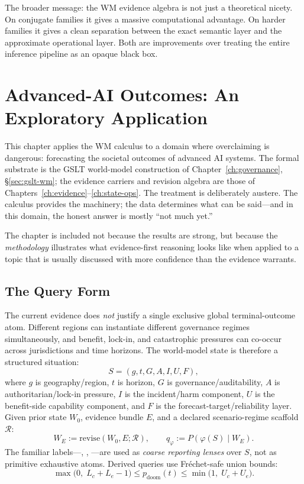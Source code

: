 \documentclass[11pt,openany]{report}
\begin{document}
\noindent
The broader message: the WM evidence algebra is not just a
theoretical nicety.  On conjugate families it gives a massive
computational advantage.  On harder families it gives a clean
separation between the exact semantic layer and the approximate
operational layer.  Both are improvements over treating the
entire inference pipeline as an opaque black box.


\chapter{Advanced-AI Outcomes: An Exploratory Application}
\label{ch:ai-outcomes}

This chapter applies the WM calculus to a domain where
overclaiming is dangerous: forecasting the societal outcomes of
advanced AI systems.  The formal substrate is the GSLT
world-model construction of Chapter~\ref{ch:governance},
\S\ref{sec:gslt-wm}; the evidence carriers and revision algebra
are those of Chapters~\ref{ch:evidence}--\ref{ch:state-ops}.
The treatment is deliberately austere.
The calculus provides the machinery; the data determines what
can be said---and in this domain, the honest answer is mostly
``not much yet.''

The chapter is included not because the results are strong,
but because the \emph{methodology} illustrates what
evidence-first reasoning looks like when applied to a topic
that is usually discussed with more confidence than the evidence
warrants.


\section{The Query Form}

The current evidence does \emph{not} justify a single exclusive
global terminal-outcome atom.  Different regions can instantiate
different governance regimes simultaneously, and benefit, lock-in,
and catastrophic pressures can co-occur across jurisdictions and
time horizons.  The world-model state is therefore a structured
situation:
\[
  S = (g, t, G, A, I, U, F),
\]
where $g$ is geography/region, $t$ is horizon, $G$ is
governance/auditability, $A$ is authoritarian/lock-in pressure,
$I$ is the incident/harm component, $U$ is the benefit-side
capability component, and $F$ is the forecast-target/reliability
layer.  Given prior state $W_0$, evidence bundle $E$, and a
declared scenario-regime scaffold $\mathcal{R}$:
\[
  W_E := \mathrm{revise}(W_0, E; \mathcal{R}),
  \qquad
  q_{\varphi} := P(\varphi(S) \mid W_E).
\]
The familiar labels---,
, ---are used as
\emph{coarse reporting lenses} over $S$, not as primitive
exhaustive atoms.  Derived queries use Fréchet-safe union
bounds:
\[
  \max\!\bigl(0,\;L_c + L_e - 1\bigr)
  \le p_{\mathrm{doom}}(t) \le
  \min\!\bigl(1,\;U_c + U_e\bigr).
\]
\end{document}
